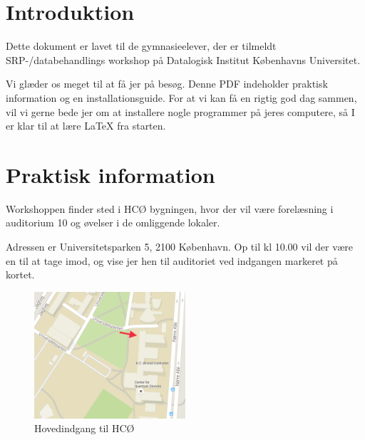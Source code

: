 \documentclass{article}                                                        %
\begin{document}
\section{Introduktion}
    Dette dokument er lavet til de gymnasieelever, der er tilmeldt
    SRP-/databehandlings workshop på Datalogisk Institut Københavns Universitet.

    Vi glæder os meget til at få jer på besøg. Denne PDF indeholder praktisk
    information og en installationsguide. For at vi kan få en rigtig god
    dag sammen, vil vi gerne bede jer om at installere nogle programmer på jeres computere, så I er klar til at lære LaTeX fra starten.


\section{Praktisk information}
    Workshoppen finder sted i HCØ bygningen, hvor der vil være forelæsning i
    auditorium 10 og øvelser i de omliggende  lokaler.

    Adressen er Universitetsparken 5, 2100 København.
    Op til kl 10.00 vil der være en til at tage imod, og vise jer hen til
    auditoriet ved indgangen markeret på kortet.
    \begin{figure}[h!]
        \caption{Hovedindgang til HCØ}
        \centering
        \includegraphics[width=0.5\textwidth]{kort.png}
    \end{figure}
\end{document}
